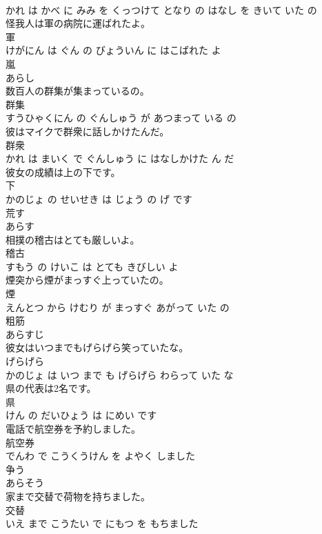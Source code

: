 \documentclass[8pt]{extreport}
\begin{document}
\begin{CJK}{UTF8}{min}
\\	かれ は かべ に みみ を くっつけて となり の はなし を きいて いた の			
\\	怪我人は軍の病院に運ばれたよ。	
\\	軍 
\\	けがにん は ぐん の びょういん に はこばれた よ			
\\	嵐	
\\	あらし			
\\	数百人の群集が集まっているの。	
\\	群集 
\\	すうひゃくにん の ぐんしゅう が あつまって いる の			
\\	彼はマイクで群衆に話しかけたんだ。	
\\	群衆 
\\	かれ は まいく で ぐんしゅう に はなしかけた ん だ			
\\	彼女の成績は上の下です。	
\\	下 
\\	かのじょ の せいせき は じょう の げ です			
\\	荒す	
\\	あらす			
\\	相撲の稽古はとても厳しいよ。	
\\	稽古 
\\	すもう の けいこ は とても きびしい よ			
\\	煙突から煙がまっすぐ上っていたの。	
\\	煙 
\\	えんとつ から けむり が まっすぐ あがって いた の			
\\	粗筋	
\\	あらすじ			
\\	彼女はいつまでもげらげら笑っていたな。	
\\	げらげら 
\\	かのじょ は いつ まで も げらげら わらって いた な			
\\	県の代表は2名です。	
\\	県 
\\	けん の だいひょう は にめい です			
\\	電話で航空券を予約しました。	
\\	航空券 
\\	でんわ で こうくうけん を よやく しました			
\\	争う	
\\	あらそう			
\\	家まで交替で荷物を持ちました。	
\\	交替 
\\	いえ まで こうたい で にもつ を もちました			

\end{CJK}
\end{document}
